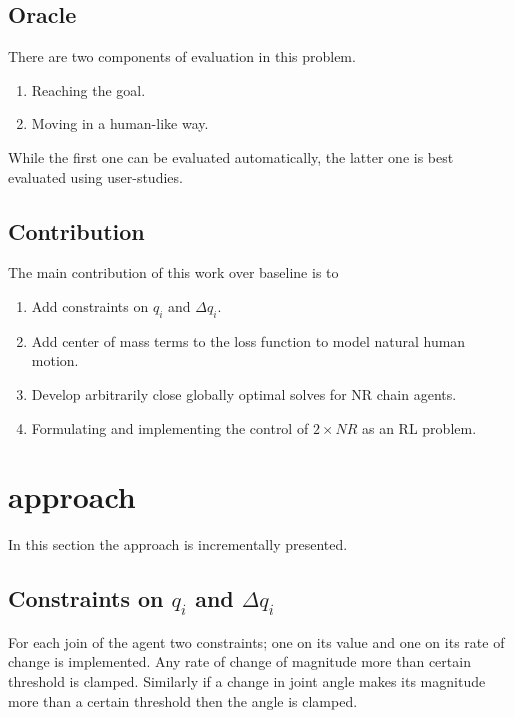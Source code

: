 \documentclass[12pt]{article}
\begin{document}
\subsection{Oracle}
There are two components of evaluation in this problem.
\begin{enumerate}[nolistsep]
    \item Reaching the goal.
    \item Moving in a human-like way.
\end{enumerate}
While the first one can be evaluated automatically, the latter one is best evaluated using user-studies.
\subsection{Contribution}
The main contribution of this work over baseline is to
\begin{enumerate}[nolistsep]
    \item Add constraints on $q_i$ and $\Delta q_i$.
    \item Add center of mass terms to the loss function to model natural human motion.
    \item Develop arbitrarily close globally optimal solves for NR chain agents.
    \item Formulating and implementing the control of $2 \times NR$ as an RL problem.
\end{enumerate}

\section{approach}
In this section the approach is incrementally presented.

\subsection{Constraints on $q_i$ and $\Delta q_i$}
For each join of the agent two constraints; one on its value and one on its rate of change is implemented.
Any rate of change of magnitude more than certain threshold is clamped.
Similarly if a change in joint angle makes its magnitude more than a certain threshold then the angle is clamped.
\end{document}
